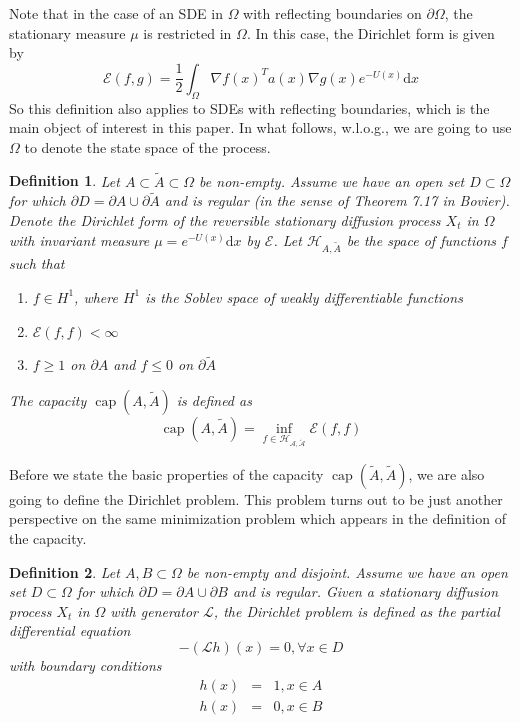 \documentclass[english, aip, jcp, priprint, graphicx]{revtex4-1}
\newtheorem{definition}{Definition}
\theoremstyle{plain}
\theoremstyle{definition}
\theoremstyle{plain}
\begin{document}
Note that in the case of an SDE in $\Omega$ with reflecting boundaries on
$\partial \Omega$, the stationary measure ${\mu}$ is restricted in
$\Omega$. In this case, the Dirichlet form is given by
\[ \mathcal{E} (f, g) = \frac{1}{2} \int_{\Omega} \nabla f (x)^T a (x) \nabla
g (x) e^{- U (x)} \mathrm{d} x \]
So this definition also applies to SDEs with reflecting boundaries, which is
the main object of interest in this paper. In what follows, w.l.o.g., we are
going to use $\Omega$ to denote the state space of the process.

\begin{definition}
Let $A \subset \tilde{A} \subset \Omega$ be non-empty. Assume we have an
open set $D \subset \Omega$ for which $\partial D = \partial A \cup \partial
\tilde{A}$ and is regular (in the sense of Theorem 7.17 in
Bovier\cite{Bovier2016-ez}). Denote the Dirichlet form of the reversible
stationary diffusion process $X_t$ in $\Omega$ with invariant measure
${\mu}= e^{- U (x)} \mathrm{d} x$ by $\mathcal{E}$. Let $\mathcal{H}_{A,
\tilde{A}}$ be the space of functions $f$ such that
\begin{enumerate}
\item $f \in H^1$, where $H^1$ is the Soblev space of weakly
differentiable functions

\item $\mathcal{E} (f, f) < \infty$

\item $f \geqslant 1$ on $\partial A$ and $f \leqslant 0$ on $\partial
\tilde{A}$
\end{enumerate}
The capacity $\ensuremath{\operatorname{cap}} (A, \tilde{A})$ is defined as
\[ \ensuremath{\operatorname{cap}} (A, \tilde{A}) = \inf_{f \in
\mathcal{H_{A, \tilde{A}}}} \mathcal{E} (f, f) \]
\end{definition}

Before we state the basic properties of the capacity
$\ensuremath{\operatorname{cap}} (\tilde{A}, \tilde{A})$, we are also going to
define the Dirichlet problem. This problem turns out to be just another
perspective on the same minimization problem which appears in the definition
of the capacity.

\begin{definition}
Let $A, B \subset \Omega$ be non-empty and disjoint. Assume we have an open
set $D \subset \Omega$ for which $\partial D = \partial A \cup \partial B$
and is regular. Given a stationary diffusion process $X_t$ in $\Omega$ with
generator $\mathcal{L}$, the Dirichlet problem is defined as the partial
differential equation
\[ - (\mathcal{L} h) (x) = 0, \forall x \in D \]
with boundary conditions
\begin{eqnarray*}
h (x) & = & 1, x \in A\\
h (x) & = & 0, x \in B
\end{eqnarray*}
\end{definition}
\end{document}
